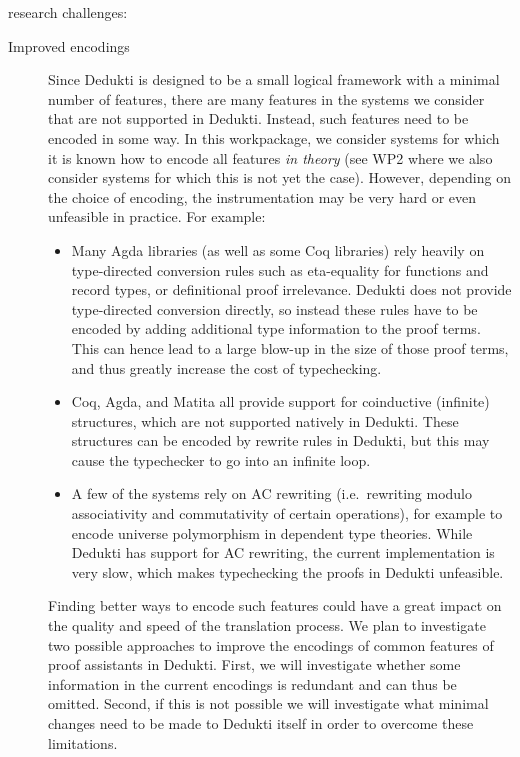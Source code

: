 research challenges:
\begin{description}

  \item[Improved encodings] Since Dedukti is designed to be a small
  logical framework with a minimal number of features, there are many
  features in the systems we consider that are not supported in
  Dedukti. Instead, such features need to be encoded in some way. In
  this workpackage, we consider systems for which it is known how to
  encode all features \emph{in theory} (see WP2 where we also consider
  systems for which this is not yet the case). However, depending on
  the choice of encoding, the instrumentation may be very hard or even
  unfeasible in practice. For example:
  \begin{itemize}

    \item Many Agda libraries (as well as some Coq libraries) rely
    heavily on type-directed conversion rules such as eta-equality for
    functions and record types, or definitional proof
    irrelevance. Dedukti does not provide type-directed conversion
    directly, so instead these rules have to be encoded by adding
    additional type information to the proof terms. This can hence
    lead to a large blow-up in the size of those proof terms, and thus
    greatly increase the cost of typechecking.

    \item Coq, Agda, and Matita all provide support for coinductive
    (infinite) structures, which are not supported natively in
    Dedukti. These structures can be encoded by rewrite rules in
    Dedukti, but this may cause the typechecker to go into an infinite
    loop.

    \item A few of the systems rely on AC rewriting (i.e.~rewriting
    modulo associativity and commutativity of certain operations), for
    example to encode universe polymorphism in dependent type
    theories. While Dedukti has support for AC rewriting, the current
    implementation is very slow, which makes typechecking the proofs
    in Dedukti unfeasible.

  \end{itemize}
  Finding better ways to encode such features could have a great
  impact on the quality and speed of the translation process.  We plan
  to investigate two possible approaches to improve the encodings of
  common features of proof assistants in Dedukti. First, we will
  investigate whether some information in the current encodings is
  redundant and can thus be omitted. Second, if this is not possible
  we will investigate what minimal changes need to be made to Dedukti
  itself in order to overcome these limitations.


\end{description}
